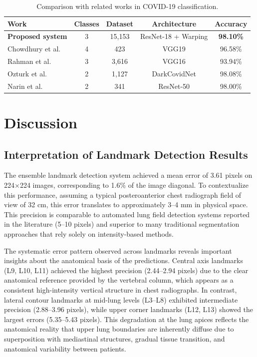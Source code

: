 \documentclass[applsci,article,submit,pdftex,moreauthors]{Definitions/mdpi}
\begin{document}
\begin{table}[H]
\caption{Comparison with related works in COVID-19 classification.\label{tab:comparacion_literatura}}
\begin{tabularx}{\textwidth}{XCCCC}
\toprule
\textbf{Work} & \textbf{Classes} & \textbf{Dataset} & \textbf{Architecture} & \textbf{Accuracy}\\
\midrule
\textbf{Proposed system} & 3 & 15,153 & ResNet-18 + Warping & \textbf{98.10\%}\\
\midrule
Chowdhury et al.~\cite{chowdhury2020can} & 4 & 423 & VGG19 & 96.58\%\\
Rahman et al.~\cite{rahman2021exploring} & 3 & 3,616 & VGG16 & 93.94\%\\
Ozturk et al.~\cite{ozturk2020automated} & 2 & 1,127 & DarkCovidNet & 98.08\%\\
Narin et al.~\cite{narin2021automatic} & 2 & 341 & ResNet-50 & 98.00\%\\
\bottomrule
\end{tabularx}
\end{table}

\section{Discussion}

\subsection{Interpretation of Landmark Detection Results}

The ensemble landmark detection system achieved a mean error of 3.61 pixels on 224$\times$224 images, corresponding to 1.6\% of the image diagonal. To contextualize this performance, assuming a typical posteroanterior chest radiograph field of view of 32 cm, this error translates to approximately 3--4 mm in physical space. This precision is comparable to automated lung field detection systems reported in the literature (5--10 pixels) and superior to many traditional segmentation approaches that rely solely on intensity-based methods.

The systematic error pattern observed across landmarks reveals important insights about the anatomical basis of the predictions. Central axis landmarks (L9, L10, L11) achieved the highest precision (2.44--2.94 pixels) due to the clear anatomical reference provided by the vertebral column, which appears as a consistent high-intensity vertical structure in chest radiographs. In contrast, lateral contour landmarks at mid-lung levels (L3--L8) exhibited intermediate precision (2.88--3.96 pixels), while upper corner landmarks (L12, L13) showed the largest errors (5.35--5.43 pixels). This degradation at the lung apices reflects the anatomical reality that upper lung boundaries are inherently diffuse due to superposition with mediastinal structures, gradual tissue transition, and anatomical variability between patients.
\end{document}
